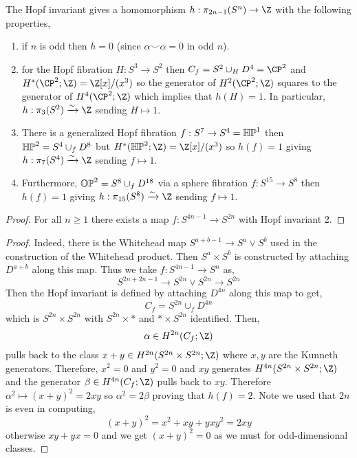\documentclass[12pt]{extarticle}
\begin{document}
\begin{prop}
The Hopf invariant gives a homomorphism $h : \pi_{2n - 1}(S^n) \to \Z$ with the following properties,
\begin{enumerate}
\item if $n$ is odd then $h = 0$ (since $\alpha \smile \alpha = 0$ in odd $n$).
\item for the Hopf fibration $H : S^3 \to S^2$ then $C_f = S^2 \cup_H D^4 = \CP^2$ and $H^*(\CP^2; \Z) = \Z[x]/(x^3)$ so the generator of $H^2(\CP^2; \Z)$ squares to the generator of $H^4(\CP^2; \Z)$ which implies that $h(H) = 1$. In particular, $h : \pi_3(S^2) \xrightarrow{\sim} \Z$ sending $H \mapsto 1$. 
\item There is a generalized Hopf fibration $f : S^7 \to S^4 = \mathbb{HP}^1$ then $\mathbb{HP}^2 = S^4 \cup_f D^8$ but $H^*(\HP^2; \Z) = \Z[x]/(x^3)$ so $h(f) = 1$ giving $h : \pi_7(S^4) \xrightarrow{\sim} \Z$ sending $f \mapsto 1$.
\item Furthermore, $\mathbb{OP}^2 = S^8 \cup_f D^{18}$ via a sphere fibration $f : S^{15} \to S^8$ then $h(f) = 1$ giving $h : \pi_{15}(S^8) \xrightarrow{\sim} \Z$ sending $f \mapsto 1$.
\end{enumerate}
\end{prop}

\begin{proof}
For all $n \ge 1$ there exists a map $f : S^{4n - 1} \to S^{2n}$ with Hopf invariant $2$.
\end{proof}

\begin{proof}
Indeed, there is the Whitehead map $S^{a+b-1} \to S^a \vee S^b$ used in the construction of the Whitehead product. Then $S^a \times S^b$ is constructed by attaching $D^{a+b}$ along this map. Thus we take $f : S^{4n-1} \to S^n$ as,
\[ S^{2n+2n-1} \to S^{2n} \vee S^{2n} \to S^{2n} \]
Then the Hopf invariant is defined by attaching $D^{4n}$ along this map to get,
\[ C_f = S^{2n} \cup_f D^{4n} \]
which is $S^{2n} \times S^{2n}$ with $S^{2n} \times *$ and $* \times S^{2n}$ identified. Then,
\[ \alpha \in H^{2n}(C_f;\Z) \]
pulls back to the class $x + y \in H^{2n}(S^{2n} \times S^{2n}; \Z)$ where $x,y$ are the Kunneth generators. Therefore, $x^2 = 0$ and $y^2 = 0$ and $xy$ generates $H^{4n}(S^{2n} \times S^{2n}; \Z)$ and the generator $\beta \in H^{4n}(C_f; \Z)$ pulls back to $xy$. Therefore $\alpha^2 \mapsto (x+y)^2 = 2 xy$ so $\alpha^2 = 2 \beta$ proving that $h(f) = 2$. Note we used that $2n$ is even in computing,
\[ (x+y)^2 = x^2 + xy + yx y^2 = 2 xy \]
otherwise $xy + yx = 0$ and we get $(x+y)^2 = 0$ as we must for odd-dimensional classes.
\end{proof}
\end{document}
